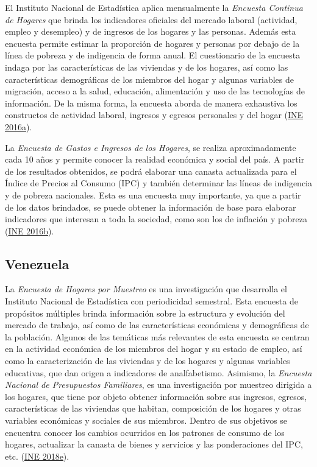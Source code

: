 \documentclass[
  12pt,
  spanish,
]{book}
\begin{document}
El Instituto Nacional de Estadística aplica mensualmente la \emph{Encuesta Continua de Hogares} que brinda los indicadores oficiales del mercado laboral (actividad, empleo y desempleo) y de ingresos de los hogares y las personas. Además esta encuesta permite estimar la proporción de hogares y personas por debajo de la línea de pobreza y de indigencia de forma anual. El cuestionario de la encuesta indaga por las características de las viviendas y de los hogares, así como las características demográficas de los miembros del hogar y algunas variables de migración, acceso a la salud, educación, alimentación y uso de las tecnologías de información. De la misma forma, la encuesta aborda de manera exhaustiva los constructos de actividad laboral, ingresos y egresos personales y del hogar (\protect\hyperlink{ref-INE-UY_2016}{INE 2016a}).

La \emph{Encuesta de Gastos e Ingresos de los Hogares}, se realiza aproximadamente cada 10 años y permite conocer la realidad económica y social del país. A partir de los resultados obtenidos, se podrá elaborar una canasta actualizada para el Índice de Precios al Consumo (IPC) y también determinar las líneas de indigencia y de pobreza nacionales. Esta es una encuesta muy importante, ya que a partir de los datos brindados, se puede obtener la información de base para elaborar indicadores que interesan a toda la sociedad, como son los de inflación y pobreza (\protect\hyperlink{ref-INE2-UY}{INE 2016b}).

\hypertarget{venezuela}{%
\subsection*{Venezuela}\label{venezuela}}

La \emph{Encuesta de Hogares por Muestreo} es una investigación que desarrolla el Instituto Nacional de Estadística con periodicidad semestral. Esta encuesta de propósitos múltiples brinda información sobre la estructura y evolución del mercado de trabajo, así como de las características económicas y demográficas de la población. Algunos de las temáticas más relevantes de esta encuesta se centran en la actividad económica de los miembros del hogar y su estado de empleo, así como la caracterización de las viviendas y de los hogares y algunas variables educativas, que dan origen a indicadores de analfabetismo. Asimismo, la \emph{Encuesta Nacional de Presupuestos Familiares}, es una investigación por muestreo dirigida a los hogares, que tiene por objeto obtener información sobre sus ingresos, egresos, características de las viviendas que habitan, composición de los hogares y otras variables económicas y sociales de sus miembros. Dentro de sus objetivos se encuentra conocer los cambios ocurridos en los patrones de consumo de los hogares, actualizar la canasta de bienes y servicios y las ponderaciones del IPC, etc. (\protect\hyperlink{ref-INE-VE}{INE 2018e}).
\end{document}
